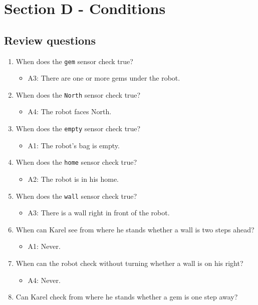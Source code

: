 \documentclass[article,A4,12pt]{llncs}
\begin{document}
\section{Section D - Conditions}

\subsection{Review questions}

\begin{enumerate}
\item When does the {\tt gem} sensor check true?
  \begin{itemize}
    \item A3: There are one or more gems under the robot.
  \end{itemize}
\item When does the {\tt North} sensor check true?
  \begin{itemize}
    \item A4: The robot faces North.
  \end{itemize}
\item When does the {\tt empty} sensor check true?
  \begin{itemize}
    \item A1: The robot's bag is empty.
  \end{itemize}
\item When does the {\tt home} sensor check true?
  \begin{itemize}
    \item A2: The robot is in his home.
  \end{itemize}
\item When does the {\tt wall} sensor check true?
  \begin{itemize}
    \item A3: There is a wall right in front of the robot.
  \end{itemize}
\item When can Karel see from where he stands whether a wall is two steps ahead?
  \begin{itemize}
    \item A1: Never.
  \end{itemize}
\item When can the robot check without turning whether a wall is on his right?
  \begin{itemize}
    \item A4: Never.
  \end{itemize}
\item Can Karel check from where he stands whether a gem is one step away?

\end{enumerate}
\end{document}
